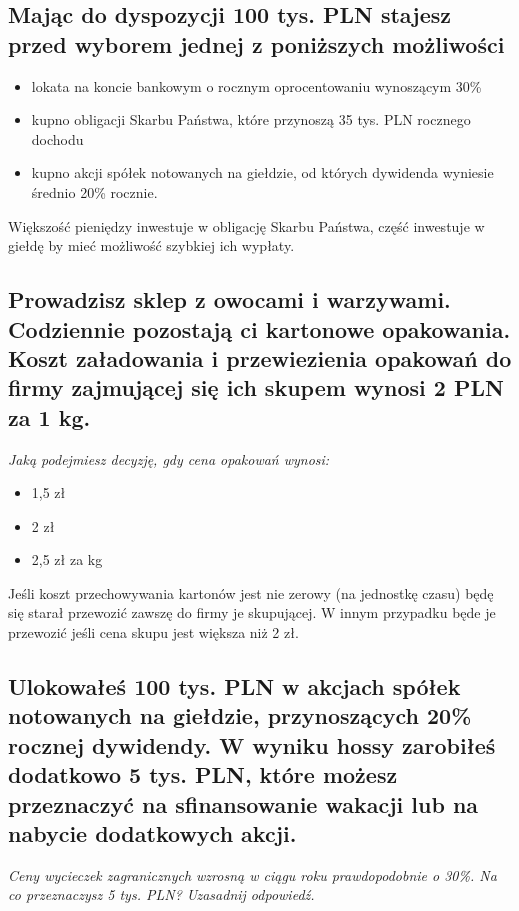 \documentclass[a4paper,12pt]{article}
\begin{document}
\subsection{Mając do dyspozycji 100 tys. PLN stajesz przed wyborem jednej z poniższych możliwości}

\begin{itemize}
	\item lokata na koncie bankowym o rocznym oprocentowaniu wynoszącym 30\%
	\item kupno obligacji Skarbu Państwa, które przynoszą 35 tys. PLN rocznego dochodu
	\item kupno akcji spółek notowanych na giełdzie, od których dywidenda wyniesie średnio 20\% rocznie.
\end{itemize}

Większość pieniędzy inwestuje w obligację Skarbu Państwa, część inwestuje w giełdę by mieć możliwość szybkiej ich wypłaty.

\subsection{Prowadzisz sklep z owocami i warzywami. Codziennie pozostają ci kartonowe opakowania. Koszt załadowania i przewiezienia opakowań do firmy zajmującej się ich skupem wynosi 2 PLN za 1 kg. }

\emph{Jaką podejmiesz decyzję, gdy cena opa­kowań wynosi:}

\begin{itemize}
	\item 1,5 zł
	\item 2 zł
	\item 2,5 zł za kg
\end{itemize}

Jeśli koszt przechowywania kartonów jest nie zerowy (na jednostkę czasu) będę się starał przewozić zawszę do firmy je skupującej. W innym przypadku będe je przewozić jeśli cena skupu jest większa niż 2 zł.

\subsection{Ulokowałeś 100 tys. PLN w akcjach spółek notowanych na giełdzie, przy­noszących 20\% rocznej dywidendy. W wyniku hossy zarobiłeś dodatkowo 5 tys. PLN, które możesz przeznaczyć na sfinansowanie wakacji lub na nabycie dodatkowych akcji.}

\emph{Ceny wycieczek zagranicznych wzrosną w ciągu roku prawdopodobnie o 30\%.
	Na co przeznaczysz 5 tys. PLN? Uzasadnij odpo­wiedź.}
\end{document}
